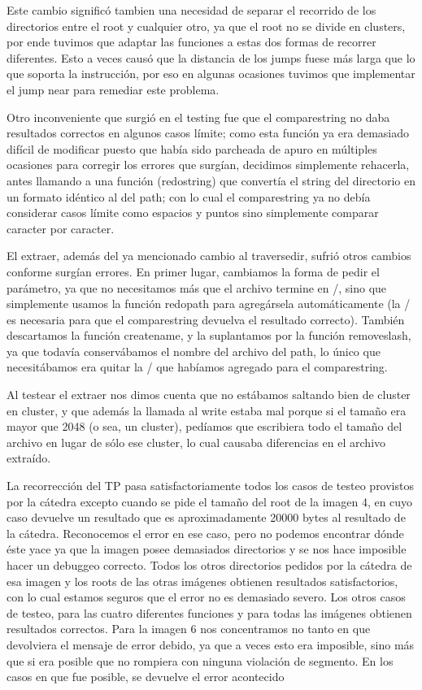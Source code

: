 \documentclass[a4paper,10pt]{article}
\begin{document}
Este cambio significó tambien una necesidad de separar el recorrido de los directorios entre el root y cualquier otro, ya que el root no se divide en clusters, por ende tuvimos que adaptar las funciones a estas dos formas de recorrer diferentes. Esto a veces causó que la distancia de los jumps fuese más larga que lo que soporta la instrucción, por eso en algunas ocasiones tuvimos que implementar el jump near para remediar este problema.

Otro inconveniente que surgió en el testing fue que el comparestring no daba resultados correctos en algunos casos límite; como esta función ya era demasiado difícil de modificar puesto que había sido parcheada de apuro en múltiples ocasiones para corregir los errores que surgían, decidimos simplemente rehacerla, antes llamando a una función (redostring) que convertía el string del directorio en un formato idéntico al del path; con lo cual el comparestring ya no debía considerar casos límite como espacios y puntos sino simplemente comparar caracter por caracter.

El extraer, además del ya mencionado cambio al traversedir, sufrió otros cambios conforme surgían errores. En primer lugar, cambiamos la forma de pedir el parámetro, ya que no necesitamos más que el archivo termine en /, sino que simplemente usamos la función redopath para agregársela automáticamente (la / es necesaria para que el comparestring devuelva el resultado correcto). También descartamos la función createname, y la suplantamos por la función removeslash, ya que todavía conservábamos el nombre del archivo del path, lo único que necesitábamos era quitar la / que habíamos agregado para el comparestring.

Al testear el extraer nos dimos cuenta que no estábamos saltando bien de cluster en cluster, y que además la llamada al write estaba mal porque si el tamaño era mayor que 2048 (o sea, un cluster), pedíamos que escribiera todo el tamaño del archivo en lugar de sólo ese cluster, lo cual causaba diferencias en el archivo extraído.

La recorrección del TP pasa satisfactoriamente todos los casos de testeo provistos por la cátedra excepto cuando se pide el tamaño del root de la imagen 4, en cuyo caso devuelve un resultado que es aproximadamente 20000 bytes al resultado de la cátedra. Reconocemos el error en ese caso, pero no podemos encontrar dónde éste yace ya que la imagen posee demasiados directorios y se nos hace imposible hacer un debuggeo correcto. Todos los otros directorios pedidos por la cátedra de esa imagen y los roots de las otras imágenes obtienen resultados satisfactorios, con lo cual estamos seguros que el error no es demasiado severo. Los otros casos de testeo, para las cuatro diferentes funciones y para todas las imágenes obtienen resultados correctos. Para la imagen 6 nos concentramos no tanto en que devolviera el mensaje de error debido, ya que a veces esto era imposible, sino más que si era posible que no rompiera con ninguna violación de segmento. En los casos en que fue posible, se devuelve el error acontecido
\end{document}
